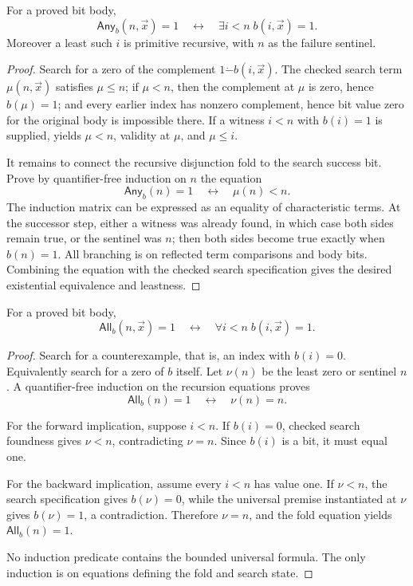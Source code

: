 \begin{lemma}
\label{lem:any-reflection}
For a proved bit body,
\[
  \mathsf{Any}_b(n,\vec x)=1
  \quad\leftrightarrow\quad
  \exists i<n\; b(i,\vec x)=1.
\]
Moreover a least such \(i\) is primitive recursive, with \(n\) as the failure sentinel.
\end{lemma}
\begin{proof}
Search for a zero of the complement \(1\mathbin{\dot-}b(i,\vec x)\).  The checked search term \(\mu(n,\vec x)\) satisfies \(\mu\le n\); if \(\mu<n\), then the complement at \(\mu\) is zero, hence \(b(\mu)=1\); and every earlier index has nonzero complement, hence bit value zero for the original body is impossible there.  If a witness \(i<n\) with \(b(i)=1\) is supplied,  yields \(\mu<n\), validity at \(\mu\), and \(\mu\le i\).

It remains to connect the recursive disjunction fold to the search success bit.  Prove by quantifier-free induction on \(n\) the equation
\[
  \mathsf{Any}_b(n)=1
  \quad\leftrightarrow\quad
  \mu(n)<n.
\]
The induction matrix can be expressed as an equality of characteristic terms.  At the successor step, either a witness was already found, in which case both sides remain true, or the sentinel was \(n\); then both sides become true exactly when \(b(n)=1\).  All branching is on reflected term comparisons and body bits.  Combining the equation with the checked search specification gives the desired existential equivalence and leastness.
\end{proof}

\begin{lemma}
\label{lem:all-reflection}
For a proved bit body,
\[
  \mathsf{All}_b(n,\vec x)=1
  \quad\leftrightarrow\quad
  \forall i<n\;b(i,\vec x)=1.
\]
\end{lemma}
\begin{proof}
Search for a counterexample, that is, an index with \(b(i)=0\).  Equivalently search for a zero of \(b\) itself.  Let \(\nu(n)\) be the least zero or sentinel \(n\).  A quantifier-free induction on the recursion equations proves
\[
  \mathsf{All}_b(n)=1 \quad\leftrightarrow\quad \nu(n)=n.
\]

For the forward implication, suppose \(i<n\).  If \(b(i)=0\), checked search foundness gives \(\nu<n\), contradicting \(\nu=n\).  Since \(b(i)\) is a bit, it must equal one.

For the backward implication, assume every \(i<n\) has value one.  If \(\nu<n\), the search specification gives \(b(\nu)=0\), while the universal premise instantiated at \(\nu\) gives \(b(\nu)=1\), a contradiction.  Therefore \(\nu=n\), and the fold equation yields \(\mathsf{All}_b(n)=1\).

No induction predicate contains the bounded universal formula.  The only induction is on equations defining the fold and search state.
\end{proof}

